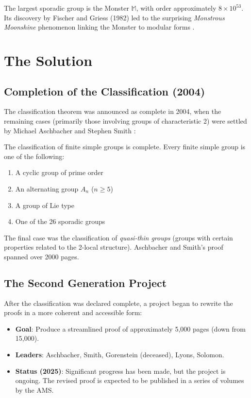 The largest sporadic group is the Monster $\mathbb{M}$, with order approximately $8 \times 10^{53}$. Its discovery by Fischer and Griess (1982) led to the surprising \emph{Monstrous Moonshine} phenomenon linking the Monster to modular forms \cite{conway1979}.

\section{The Solution}

\subsection{Completion of the Classification (2004)}

The classification theorem was announced as complete in 2004, when the remaining cases (primarily those involving groups of characteristic 2) were settled by Michael Aschbacher and Stephen Smith \cite{aschbacher2004}:

\begin{theorem}
The classification of finite simple groups is complete. Every finite simple group is one of the following:
\begin{enumerate}
\item A cyclic group of prime order
\item An alternating group $A_n$ ($n \geq 5$)
\item A group of Lie type
\item One of the 26 sporadic groups
\end{enumerate}
\end{theorem}

The final case was the classification of \emph{quasi-thin groups} (groups with certain properties related to the 2-local structure). Aschbacher and Smith's proof spanned over 2000 pages.

\subsection{The Second Generation Project}

After the classification was declared complete, a project began to rewrite the proofs in a more coherent and accessible form:

\begin{itemize}
\item \textbf{Goal}: Produce a streamlined proof of approximately 5,000 pages (down from 15,000).
\item \textbf{Leaders}: Aschbacher, Smith, Gorenstein (deceased), Lyons, Solomon.
\item \textbf{Status (2025)}: Significant progress has been made, but the project is ongoing. The revised proof is expected to be published in a series of volumes by the AMS.
\end{itemize}

